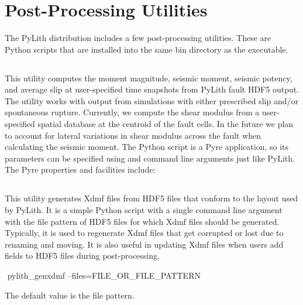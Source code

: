 \section{Post-Processing Utilities}

The PyLith distribution includes a few post-processing utilities.
These are Python scripts that are installed into the same bin directory
as the  executable.


\subsection{}

This utility computes the moment magnitude, seismic moment, seismic
potency, and average slip at user-specified time snapshots from PyLith
fault HDF5 output. The utility works with output from simulations
with either prescribed slip and/or spontaneous rupture. Currently,
we compute the shear modulus from a user-specified spatial database
at the centroid of the fault cells. In the future we plan to account
for lateral variations in shear modulus across the fault when calculating
the seismic moment. The Python script is a Pyre application, so its
parameters can be specified using  and command line arguments
just like PyLith. The Pyre properties and facilities include:
\begin{inventory}
\end{inventory}

\subsection{}
\label{sec:pylith:genxdmf}

This utility generates Xdmf files from HDF5 files that conform to the
layout used by PyLith. It is a simple Python script with a single
command line argument with the file pattern of HDF5 files for which
Xdmf files should be generated. Typically, it is used to regenerate
Xdmf files that get corrupted or lost due to renaming and moving. It
is also useful in updating Xdmf files when users add fields to HDF5
files during post-processing.
\begin{shell}
$$ pylith_genxdmf --files=FILE_OR_FILE_PATTERN
\end{shell}
The default value is the  file pattern.

